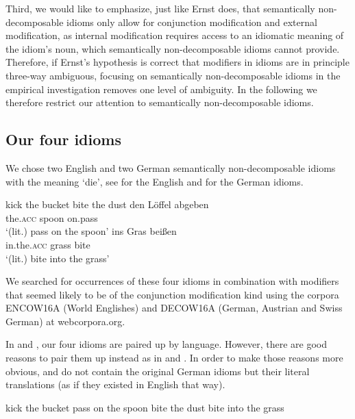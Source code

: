 \documentclass[output=paper]{langsci/langscibook}
\begin{document}
Third, we would like to emphasize, just like Ernst does, that semantically non-decomposable idioms only allow for conjunction modification and external modification, as internal modification requires access to an idiomatic meaning of the idiom's noun, which semantically non-decomposable idioms cannot provide. Therefore, if Ernst's hypothesis is correct that modifiers in idioms are in principle three-way ambiguous, focusing on semantically non-decomposable idioms in the empirical investigation removes one level of ambiguity. In the following we therefore restrict our attention to semantically non-decomposable idioms. 


\subsection{Our four idioms} \label{our four idioms}

We chose two English and two German semantically non-decomposable idioms with the meaning `die', see  for the English and  for the German idioms. 

\ea \label{ktb+btd}
\ea
kick the bucket
\ex
bite the dust
\z
\ex \label{dLa+iGb}
\ea
\gll	den Löffel abgeben \\
	the.\textsc{acc} spoon on.pass \\
\glt	`(lit.) pass on the spoon'
\ex 
\gll 	ins Gras beißen \\
	in.the.\textsc{acc} grass bite \\
\glt	`(lit.) bite into the grass'
\z
\z

\noindent We searched for occurrences of these four idioms in combination with modifiers that seemed likely to be of the conjunction modification kind using the corpora ENCOW16A (World Englishes) and DECOW16A (German, Austrian and Swiss German) at webcorpora.org.

In  and , our four idioms are paired up by language. However, there are good reasons to pair them up instead as in  and . In order to make those reasons more obvious,  and  do not contain the original German idioms but their literal 
translations (as if they existed in English that way).\largerpage[-1]

\ea \label{ktb+pots}
\ea
kick the bucket
\ex
pass on the spoon
\z
\ex \label{btd+bits}
\ea
bite the dust
\ex
bite into the grass
\z
\z
\end{document}
